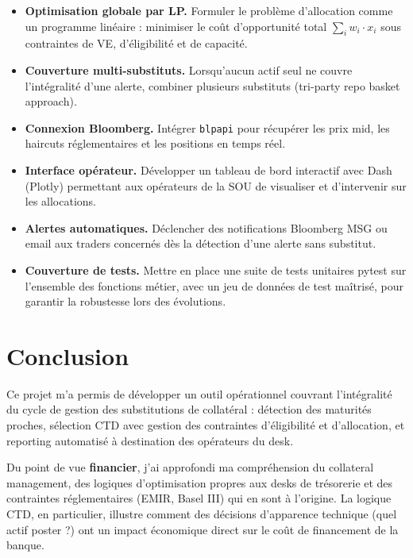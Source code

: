\documentclass[12pt,a4paper]{article}
\begin{document}
\begin{itemize}
  \item \textbf{Optimisation globale par LP.} Formuler le problème d'allocation
    comme un programme linéaire : minimiser le coût d'opportunité total
    $\sum_i w_i \cdot x_i$ sous contraintes de VE, d'éligibilité et de capacité.

  \item \textbf{Couverture multi-substituts.} Lorsqu'aucun actif seul ne couvre
    l'intégralité d'une alerte, combiner plusieurs substituts (tri-party repo
    basket approach).

  \item \textbf{Connexion Bloomberg.} Intégrer \texttt{blpapi} pour récupérer les
    prix mid, les haircuts réglementaires et les positions en temps réel.

  \item \textbf{Interface opérateur.} Développer un tableau de bord interactif
    avec Dash (Plotly) permettant aux opérateurs de la SOU de visualiser et
    d'intervenir sur les allocations.

  \item \textbf{Alertes automatiques.} Déclencher des notifications Bloomberg MSG
    ou email aux traders concernés dès la détection d'une alerte sans substitut.

  \item \textbf{Couverture de tests.} Mettre en place une suite de tests unitaires
    pytest sur l'ensemble des fonctions métier, avec un jeu de données de test
    maîtrisé, pour garantir la robustesse lors des évolutions.
\end{itemize}

\newpage
\section*{Conclusion}

Ce projet m'a permis de développer un outil opérationnel couvrant l'intégralité du
cycle de gestion des substitutions de collatéral : détection des maturités proches,
sélection CTD avec gestion des contraintes d'éligibilité et d'allocation, et reporting
automatisé à destination des opérateurs du desk.

Du point de vue \textbf{financier}, j'ai approfondi ma compréhension du collateral
management, des logiques d'optimisation propres aux desks de trésorerie et des
contraintes réglementaires (EMIR, Basel III) qui en sont à l'origine. La logique CTD,
en particulier, illustre comment des décisions d'apparence technique (quel actif poster ?)
ont un impact économique direct sur le coût de financement de la banque.
\end{document}
